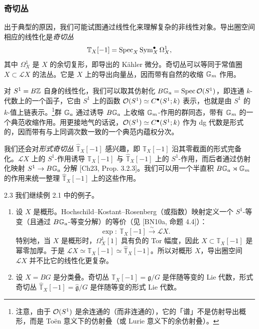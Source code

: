 \subsubsection{奇切丛}

出于典型的原因，我们可能试图通过线性化来理解复杂的非线性对象。导出圈空间相应的线性化是\emph{奇切丛}
\[
\mathbb T_X[-1]=\operatorname{Spec}_X\operatorname{Sym}^\bullet_X\Omega^1_X,
\]
其中 $\Omega^1_X$ 是 $X$ 的余切复形，即导出的 Kähler 微分。奇切丛可以等同于常值圈 $X\subset\mathcal L X$ 的法丛。它是 $X$ 上的导出向量丛，因而带有自然的收缩 $\mathbb{G}_m$ 作用。

对 $S^1=B\mathbb{Z}$ 自身的线性化，我们可以取其仿射化 $B\mathbb{G}_a=\operatorname{Spec}\mathcal{O}(S^1)$，即连通 $k$-代数上的一个函子，它由 $S^1$ 上的函数 $\mathcal{O}(S^1)\simeq C^\bullet(S^1;k)$ 表示，也就是由 $S^1$ 的 $k$-值上链表示。\footnote{注意，由于 $\mathcal{O}(S^1)$ 是余连通的（而非连通的），它的「谱」不是仿射导出概形，而是 Toën 意义下的仿射叠（或 Lurie 意义下的余仿射叠）。}群 $\mathbb{G}_a$ 通过诱导 $B\mathbb{G}_a$ 上收缩 $\mathbb{G}_m$-作用的群同态，带有 $\mathbb{G}_m$ 的一个典范收缩作用。用更接地气的话说，$\mathcal{O}(S^1)\simeq C^\bullet(S^1;k)$ 作为 dg 代数是形式的，因而带有与上同调次数一致的一个典范内蕴权分次。

我们还会对\emph{形式奇切丛} $\widehat{\mathbb T}_X[-1]$ 感兴趣，即 $\mathbb T_X[-1]$ 沿其零截面的形式完备化。$\mathcal L X$ 上的 $S^1$-作用诱导 $\mathbb T_X[-1]$ 与 $\widehat{\mathbb T}_X[-1]$ 上的 $S^1$-作用，而后者通过仿射化映射 $S^1\to B\mathbb{G}_a$ 分解 [Ch23, Prop. 3.2.3]。我们可以用一个半直积 $B\mathbb{G}_a\rtimes\mathbb{G}_m$ 的作用来统一整理 $\widehat{\mathbb T}_X[-1]$ 上的这些作用。

\begin{exam}{2.3}\label{exam:a5-01-3}
我们继续例 2.1 中的例子。
\begin{enumerate}[(1),itemsep=2pt]
\item 设 $X$ 是概形。Hochschild--Kostant--Rosenberg（或指数）映射定义一个 $S^1$-等变（且通过 $B\mathbb{G}_a$-等变分解）的等价（见 [BN10a, 命题 4.4]）：
\[
\exp:\ \mathbb T_X[-1]\xrightarrow{\ \sim\ }\mathcal L X.
\]
特别地，当 $X$ 是概形时，$\Omega^1_X[1]$ 具有负的 Tor 幅度，因此 $X\subset\mathbb T_X[-1]$ 是幂零加厚。于是 $\mathcal L X\simeq\mathbb T_X[-1]\simeq\widehat{\mathbb T}_X[-1]$。所以对概形 $X$，导出圈空间 $\mathcal L X$ 并不比它的线性化更复杂。
\item 设 $X=BG$ 是分类叠。奇切丛 $\mathbb T_X[-1]=\mathfrak g/G$ 是伴随等变的 Lie 代数，形式奇切丛 $\widehat{\mathbb T}_X[-1]=\widehat{\mathfrak g}/G$ 是伴随等变的形式 Lie 代数。
\end{enumerate}
\end{exam}

